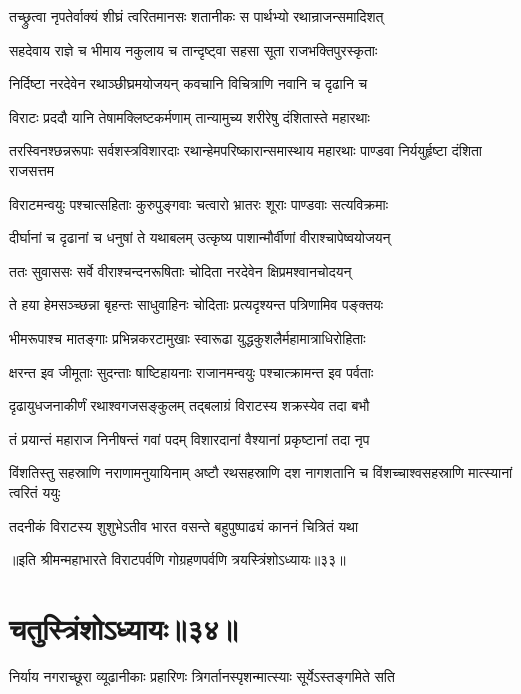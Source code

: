 \twolineshloka
{तच्छ्रुत्वा नृपतेर्वाक्यं शीघ्रं त्वरितमानसः}
{शतानीकः स पार्थभ्यो रथान्राजन्समादिशत्}


\twolineshloka
{सहदेवाय राज्ञे च भीमाय नकुलाय च}
{तान्दृष्ट्वा सहसा सूता राजभक्तिपुरस्कृताः}


\twolineshloka
{निर्दिष्टा नरदेवेन रथाञ्छीघ्रमयोजयन्}
{कवचानि विचित्राणि नवानि च दृढानि च}


\twolineshloka
{विराटः प्रददौ यानि तेषामक्लिष्टकर्मणाम्}
{तान्यामुच्य शरीरेषु दंशितास्ते महारथाः}


\threelineshloka
{तरस्विनश्छन्नरूपाः सर्वशस्त्रविशारदाः}
{रथान्हेमपरिष्कारान्समास्थाय महारथाः}
{पाण्डवा निर्ययुर्हृष्टा दंशिता राजसत्तम}


\twolineshloka
{विराटमन्वयुः पश्चात्सहिताः कुरुपुङ्गवाः}
{चत्वारो भ्रातरः शूराः पाण्डवाः सत्यविक्रमाः}


\twolineshloka
{दीर्घानां च दृढानां च धनुषां ते यथाबलम्}
{उत्कृष्य पाशान्मौर्वीणां वीराश्चापेष्वयोजयन्}


\twolineshloka
{ततः सुवाससः सर्वे वीराश्चन्दनरूषिताः}
{चोदिता नरदेवेन क्षिप्रमश्वानचोदयन्}


\twolineshloka
{ते हया हेमसञ्च्छन्ना बृहन्तः साधुवाहिनः}
{चोदिताः प्रत्यदृश्यन्त पत्रिणामिव पङ्क्तयः}


\twolineshloka
{भीमरूपाश्च मातङ्गाः प्रभिन्नकरटामुखाः}
{स्वारूढा युद्धकुशलैर्महामात्राधिरोहिताः}


\twolineshloka
{क्षरन्त इव जीमूताः सुदन्ताः षाष्टिहायनाः}
{राजानमन्वयुः पश्चात्क्रामन्त इव पर्वताः}


\twolineshloka
{दृढायुधजनाकीर्णं रथाश्वगजसङ्कुलम्}
{तद्बलाग्रं विराटस्य शक्रस्येव तदा बभौ}


\twolineshloka
{तं प्रयान्तं महाराज निनीषन्तं गवां पदम्}
{विशारदानां वैश्यानां प्रकृष्टानां तदा नृप}


\threelineshloka
{विंशतिस्तु सहस्राणि नराणामनुयायिनाम्}
{अष्टौ रथसहस्राणि दश नागशतानि च}
{विंशच्चाश्वसहस्राणि मात्स्यानां त्वरितं ययुः}


\twolineshloka
{तदनीकं विराटस्य शुशुभेऽतीव भारत}
{वसन्ते बहुपुष्पाढ्यं काननं चित्रितं यथा}

॥इति श्रीमन्महाभारते विराटपर्वणि गोग्रहणपर्वणि त्रयस्त्रिंशोऽध्यायः॥३३॥

\chapter{चतुस्त्रिंशोऽध्यायः॥३४॥}

\twolineshloka
{निर्याय नगराच्छूरा व्यूढानीकाः प्रहारिणः}
{त्रिगर्तानस्पृशन्मात्स्याः सूर्येऽस्तङ्गमिते सति}


